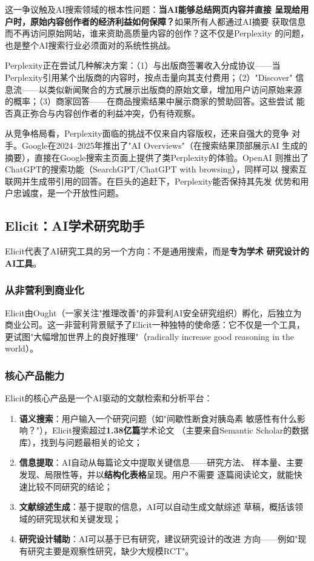 这一争议触及AI搜索领域的根本性问题：\textbf{当AI能够总结网页内容并直接
呈现给用户时，原始内容创作者的经济利益如何保障？}如果所有人都通过AI摘要
获取信息而不再访问原始网站，谁来资助高质量内容的创作？这不仅是Perplexity
的问题，也是整个AI搜索行业必须面对的系统性挑战。

Perplexity正在尝试几种解决方案：（1）与出版商签署收入分成协议——当
Perplexity引用某个出版商的内容时，按点击量向其支付费用；（2）"Discover"
信息流——以类似新闻聚合的方式展示出版商的原始文章，增加用户访问原始来源
的概率；（3）商家回答——在商品搜索结果中展示商家的赞助回答。这些尝试
能否真正弥合与内容创作者的利益冲突，仍有待观察。

从竞争格局看，Perplexity面临的挑战不仅来自内容版权，还来自强大的竞争
对手。Google在2024--2025年推出了"AI Overviews"（在搜索结果顶部展示AI
生成的摘要），直接在Google搜索主页面上提供了类Perplexity的体验。OpenAI
则推出了ChatGPT的搜索功能（SearchGPT/ChatGPT with browsing），同样可以
搜索互联网并生成带引用的回答。在巨头的追赶下，Perplexity能否保持其先发
优势和用户忠诚度，是一个开放性问题。

\subsection{Elicit：AI学术研究助手}
\label{subsec:elicit}

Elicit代表了AI研究工具的另一个方向：不是通用搜索，而是\textbf{专为学术
研究设计的AI工具}。

\subsubsection{从非营利到商业化}
Elicit由Ought（一家关注"推理改善"的非营利AI安全研究组织）孵化，后独立为
商业公司。这一非营利背景赋予了Elicit一种独特的使命感：它不仅是一个工具，
更试图"大幅增加世界上的良好推理"（radically increase good reasoning in
the world）。

\subsubsection{核心产品能力}
Elicit的核心产品是一个AI驱动的文献检索和分析平台：

\begin{enumerate}
  \item \textbf{语义搜索}：用户输入一个研究问题（如"间歇性断食对胰岛素
    敏感性有什么影响？"），Elicit搜索超过\textbf{1.38亿篇}学术论文
    （主要来自Semantic Scholar的数据库），找到与问题最相关的论文；
  \item \textbf{信息提取}：AI自动从每篇论文中提取关键信息——研究方法、
    样本量、主要发现、局限性等，并以\textbf{结构化表格}呈现。用户不需要
    逐篇阅读论文，就能快速比较不同研究的结论；
  \item \textbf{文献综述生成}：基于提取的信息，AI可以自动生成文献综述
    草稿，概括该领域的研究现状和关键发现；
  \item \textbf{研究设计辅助}：AI可以基于已有研究，建议研究设计的改进
    方向——例如"现有研究主要是观察性研究，缺少大规模RCT"。
\end{enumerate}


